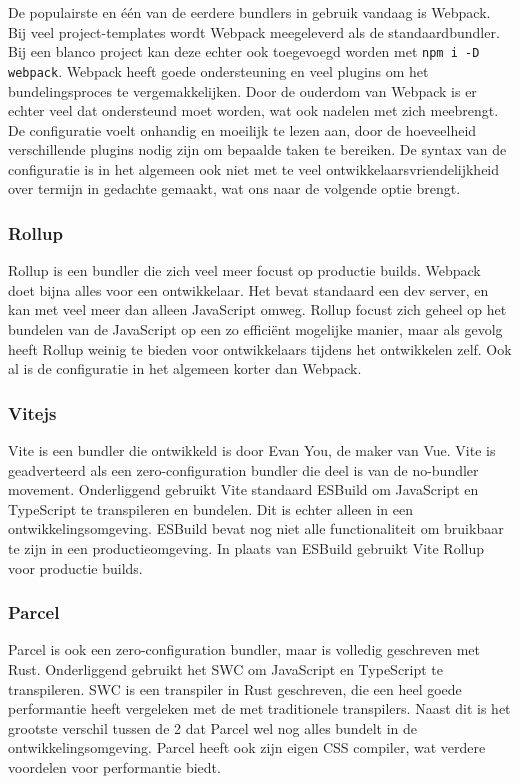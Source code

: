 De populairste en één van de eerdere bundlers in gebruik vandaag is Webpack. Bij veel project-templates wordt Webpack meegeleverd als de standaardbundler. Bij een blanco project kan deze echter ook toegevoegd worden met \lstinline{npm i -D webpack}. Webpack heeft goede ondersteuning en veel plugins om het bundelingsproces te vergemakkelijken. Door de ouderdom van Webpack is er echter veel dat ondersteund moet worden, wat ook nadelen met zich meebrengt. De configuratie voelt onhandig en moeilijk te lezen aan, door de hoeveelheid verschillende plugins nodig zijn om bepaalde taken te bereiken. De syntax van de configuratie is in het algemeen ook niet met te veel ontwikkelaarsvriendelijkheid over termijn in gedachte gemaakt, wat ons naar de volgende optie brengt.

\subsubsection{Rollup}

Rollup is een bundler die zich veel meer focust op productie builds. Webpack doet bijna alles voor een ontwikkelaar. Het bevat standaard een dev server, en kan met veel meer dan alleen JavaScript omweg. Rollup focust zich geheel op het bundelen van de JavaScript op een zo efficiënt mogelijke manier, maar als gevolg heeft Rollup weinig te bieden voor ontwikkelaars tijdens het ontwikkelen zelf. Ook al is de configuratie in het algemeen korter dan Webpack.

\subsubsection{Vitejs}

Vite is een bundler die ontwikkeld is door Evan You, de maker van Vue. Vite is geadverteerd als een zero-configuration bundler die deel is van de no-bundler movement. Onderliggend gebruikt Vite standaard ESBuild om JavaScript en TypeScript te transpileren en bundelen. Dit is echter alleen in een ontwikkelingsomgeving. ESBuild bevat nog niet alle functionaliteit om bruikbaar te zijn in een productieomgeving. In plaats van ESBuild gebruikt Vite Rollup voor productie builds. \autocite{you_2021}

\subsubsection{Parcel}

Parcel is ook een zero-configuration bundler, maar is volledig geschreven met Rust. Onderliggend gebruikt het SWC om JavaScript en TypeScript te transpileren. SWC is een transpiler in Rust geschreven, die een heel goede performantie heeft vergeleken met de met traditionele transpilers. Naast dit is het grootste verschil tussen de 2 dat Parcel wel nog alles bundelt in de ontwikkelingsomgeving. Parcel heeft ook zijn eigen CSS compiler, wat verdere voordelen voor performantie biedt. \autocite{dahan_2021}

